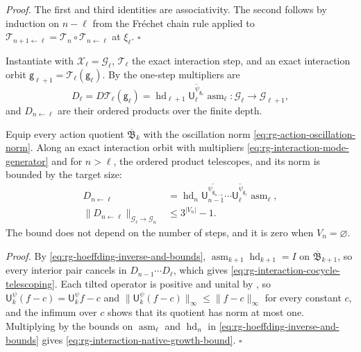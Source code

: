 \noindent\emph{Proof.}
The first and third identities are associativity. The second follows by induction
on $n-\ell$ from the Fr\'echet chain rule applied to $\mathcal
T_{n+1\leftarrow\ell}=\mathcal T_n\circ\mathcal T_{n\leftarrow\ell}$ at $\xi_\ell$.
$\square$

Instantiate  with $\mathscr X_\ell=\mathcal G_\ell$,
$\mathcal T_\ell$ the exact interaction step, and an exact interaction orbit
$\mathsf g_{\ell+1}=\mathcal T_\ell(\mathsf g_\ell)$. By
 the one-step multipliers are
\begin{equation}
D_\ell=D\mathcal T_\ell(\mathsf g_\ell)
=\operatorname{hd}_{\ell+1}\overline{\mathsf U_\ell^{\psi_{\mathsf g_\ell}}}\operatorname{asm}_\ell:
\mathcal G_\ell\longrightarrow\mathcal G_{\ell+1},
\label{eq:rg-interaction-mode-generator}
\end{equation}
and $D_{n\leftarrow\ell}$ are their ordered products over the finite depth.

Equip every action quotient $\overline{\mathfrak B}_k$ with the oscillation norm
\eqref{eq:rg-action-oscillation-norm}. Along an exact interaction orbit with
multipliers \eqref{eq:rg-interaction-mode-generator} and for $n>\ell$, the ordered
product telescopes, and its norm is bounded by the target size:
\begin{align}
D_{n\leftarrow\ell}
&=\operatorname{hd}_n\overline{\mathsf U_{n-1}^{\psi_{\mathsf g_{n-1}}}}\cdots
\overline{\mathsf U_\ell^{\psi_{\mathsf g_\ell}}}\operatorname{asm}_\ell,
\label{eq:rg-interaction-cocycle-telescoping}\\
\lVert D_{n\leftarrow\ell}\rVert_{\mathcal G_\ell\to\mathcal G_n}
&\le3^{\lvert V_n\rvert}-1 .
\label{eq:rg-interaction-native-growth-bound}
\end{align}
The bound does not depend on the number of steps, and it is zero when
$V_n=\varnothing$. 

\noindent\emph{Proof.}
By \eqref{eq:rg-hoeffding-inverse-and-bounds},
$\operatorname{asm}_{k+1}\operatorname{hd}_{k+1}=I$ on $\overline{\mathfrak
B}_{k+1}$, so every interior pair cancels in $D_{n-1}\cdots D_\ell$, which gives
\eqref{eq:rg-interaction-cocycle-telescoping}. Each tilted operator is positive and
unital by , so $\mathsf U_k^\psi(f-c)=\mathsf
U_k^\psi f-c$ and $\lVert\mathsf U_k^\psi(f-c)\rVert_\infty\le\lVert
f-c\rVert_\infty$ for every constant $c$, and the infimum over $c$ shows that its
quotient has norm at most one. Multiplying by the bounds on
$\operatorname{asm}_\ell$ and $\operatorname{hd}_n$ in
\eqref{eq:rg-hoeffding-inverse-and-bounds} gives
\eqref{eq:rg-interaction-native-growth-bound}. $\square$

